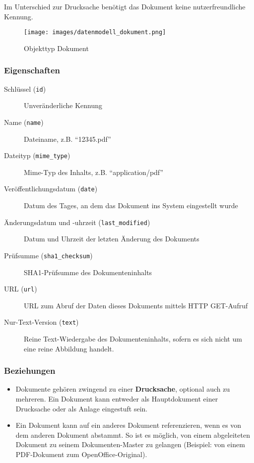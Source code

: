 \documentclass[,a4paper]{article}
\makeatletter
\def\maxwidth{\ifdim\Gin@nat@width>\linewidth\linewidth
\else\Gin@nat@width\fi}
\let\Oldincludegraphics\includegraphics
\renewcommand{\includegraphics}[1]{\Oldincludegraphics[width=\maxwidth]{#1}}
\makeatother
\begin{document}
Im Unterschied zur Drucksache benötigt das Dokument keine
nutzerfreundliche Kennung.

\begin{figure}[htbp]
\centering
\texttt{[image: images/datenmodell\_dokument.png]}
\caption{Objekttyp Dokument}
\end{figure}

\subsubsection{Eigenschaften}

\begin{description}
\item[Schlüssel (\texttt{id})]
Unveränderliche Kennung
\item[Name (\texttt{name})]
Dateiname, z.B. ``12345.pdf''
\item[Dateityp (\texttt{mime\_type})]
Mime-Typ des Inhalts, z.B. ``application/pdf''
\item[Veröffentlichungsdatum (\texttt{date})]
Datum des Tages, an dem das Dokument ins System eingestellt wurde
\item[Änderungsdatum und -uhrzeit (\texttt{last\_modified})]
Datum und Uhrzeit der letzten Änderung des Dokuments
\item[Prüfsumme (\texttt{sha1\_checksum})]
SHA1-Prüfsumme des Dokumenteninhalts
\item[URL (\texttt{url})]
URL zum Abruf der Daten dieses Dokuments mittels HTTP GET-Aufruf
\item[Nur-Text-Version (\texttt{text})]
Reine Text-Wiedergabe des Dokumenteninhalts, sofern es sich nicht um
eine reine Abbildung handelt.
\end{description}

\subsubsection{Beziehungen}

\begin{itemize}
\item
  Dokumente gehören zwingend zu einer \textbf{Drucksache}, optional auch
  zu mehreren. Ein Dokument kann entweder als Hauptdokument einer
  Drucksache oder als Anlage eingestuft sein.
\item
  Ein Dokument kann auf ein anderes Dokument referenzieren, wenn es von
  dem anderen Dokument abstammt. So ist es möglich, von einem
  abgeleiteten Dokument zu seinem Dokumenten-Master zu gelangen
  (Beispiel: von einem PDF-Dokument zum OpenOffice-Original).
\end{itemize}
\end{document}
